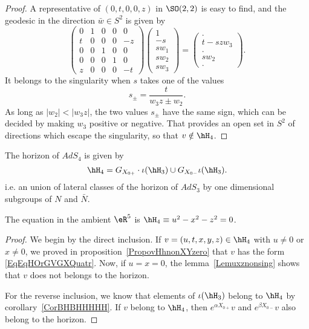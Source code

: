 \begin{proof}
		A representative of $(0,t,0,0,z)$ in $\SO(2,2)$ is easy to find, and the geodesic in the direction $\bar w\in S^2$ is given by
		\begin{equation}
			\begin{pmatrix}
				0 & 1 & 0 & 0 & 0  \\
				t & 0 & 0 & 0 & -z \\
				0 & 0 & 1 & 0 & 0  \\
				0 & 0 & 0 & 1 & 0  \\
				z & 0 & 0 & 0 & -t
			\end{pmatrix}
			\begin{pmatrix}
				1    \\
				-s   \\
				sw_1 \\
				sw_2 \\
				sw_3
			\end{pmatrix}=
			\begin{pmatrix}
				.       \\
				t-szw_3 \\
				.       \\
				sw_2    \\
				.
			\end{pmatrix}.
		\end{equation}
		It belongs to the singularity when $s$ takes one of the values
		\begin{equation}
			s_{\pm}=\frac{ t }{ w_3z\pm w_2 }.
		\end{equation}
		As long as $|w_2|<|w_3z|$, the two values $s_{\pm}$ have the same sign, which can be decided by making $w_3$ positive or negative. That provides an open set in $S^2$ of directions which escape the singularity, so that $v\notin\hH_4$.
	\end{proof}


	\begin{theorem}			\label{ThoHorQuatreInclusionHorTrois}\label{ThoEqHorQCoore}
		The horizon of $AdS_4$ is given by
		\begin{equation}		\label{EqEqHOrGVGXQuatr}
			\hH_4=G_{X_{0+}}\cdot \iota(\hH_3)\cup G_{X_{0-}}\iota(\hH_3).
		\end{equation}
		i.e. an union of lateral classes of the horizon of $AdS_3$ by one dimensional subgroups of $N$ and $\bar N$.

		The equation in the ambient $\eR^5$ is $\hH_4\equiv u^2-x^2-z^2=0$.
	\end{theorem}

	\begin{proof}
		We begin by the direct inclusion. If $v=(u,t,x,y,z)\in\hH_4$ with $u\neq 0$ or $x\neq 0$, we proved in proposition~\ref{PropovHhnonXYzero} that $v$ has the form \eqref{EqEqHOrGVGXQuatr}. Now, if $u=x=0$, the lemma~\ref{Lemuxznonsing} shows that $v$ does not belongs to the horizon.

		For the reverse inclusion, we know that elements of $\iota(\hH_3)$ belong to $\hH_4$ by corollary~\ref{CorBHBHHHHH}. If $v$ belong to $\hH_4$, then $ e^{\alpha X_{0+}}v$ and $ e^{\beta X_{0-}}v$ also belong to the horizon.
	\end{proof}

